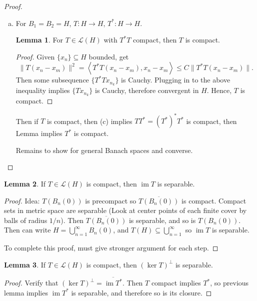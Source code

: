 \documentclass[12pt]{article}
\theoremstyle{definition}
\newtheorem{lemma}{Lemma}
\newcommand{\LL}{\mathcal{L}}
\newcommand{\<}{\left\langle}
\renewcommand{\>}{\right\rangle}
\newcommand{\seq}{\subseteq}
\DeclareMathOperator{\im}{im}
\newcommand{\clo}{\overline}
\begin{document}
\begin{proof}
     \begin{enumerate}[(b)]
        \item For $B_1 = B_2 = H$, $T: H \to H$, $T^* : H \to H$.
        
        \begin{lemma}
            For $T \in \LL(H)$ with $T^*T$ compact, then $T$ is compact.
        \end{lemma}

        \begin{proof}
            Given $\{x_n\} \seq H$ bounded, get
            \[
                \|T(x_n - x_m)\|^2
                    = \<T^*T(x_n - x_m), x_n - x_m\>
                    \leq C\|T^*T(x_n - x_m)\|.
            \]
            Then some subsequence $\{T^*Tx_{n_k}\}$ is Cauchy.
            Plugging in to the above inequality implies $\{Tx_{n_k}\}$ is Cauchy, therefore convergent in $H$.
            Hence, $T$ is compact.
        \end{proof}
        Then if $T$ is compact, then (c) implies $TT^* = (T^*)^*T^*$ is compact, then Lemma implies $T^*$ is compact.

        Remains to show for general Banach spaces and converse.
    \end{enumerate}
\end{proof}

\begin{lemma}
    If $T \in \LL(H)$  is compact, then $\im T$ is separable.
\end{lemma}

\begin{proof}
    Idea: $T(B_n(0))$ is precompact so $\clo{T(B_n(0))}$ is compact.
    Compact sets in metric space are separable (Look at center points of each finite cover by balls of radius $1/n$).
    Then $\clo{T(B_n(0))}$ is separable, and so is $T(B_n(0))$.
    Then can write $H = \bigcup_{n=1}^{\infty} B_n(0)$, and $T(H) \seq \bigcup_{n=1}^{\infty}$ so $\im T$ is separable.

    To complete this proof, must give stronger argument for each step.
\end{proof}

\begin{lemma}
    If $T \in \LL(H)$ is compact, then $(\ker T)^\perp$ is separable.
\end{lemma}

\begin{proof}
    Verify that $(\ker T)^\perp = \clo{\im T^*}$.
    Then $T$ compact implies $T^*$, so previous lemma implies $\im T^*$ is separable, and therefore so is its closure.
\end{proof}
\end{document}
